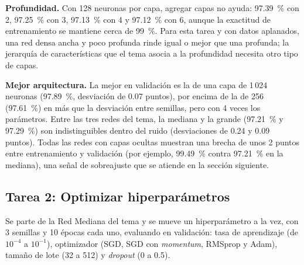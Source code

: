 \documentclass[11pt,letterpaper]{article}
\begin{document}
\textbf{Profundidad.} Con 128 neuronas por capa, agregar capas no ayuda: 97.39~\% con 2, 97.25~\% con 3, 97.13~\% con 4 y 97.12~\% con 6, aunque la exactitud de entrenamiento se mantiene cerca de 99~\%. Para esta tarea y con datos aplanados, una red densa ancha y poco profunda rinde igual o mejor que una profunda; la jerarquía de características que el tema asocia a la profundidad \parencite{iae_u4_t44} necesita otro tipo de capas.

\textbf{Mejor arquitectura.} La mejor en validación es la de una capa de 1\,024 neuronas (97.89~\%, desviación de 0.07 puntos), por encima de la de 256 (97.61~\%) en más que la desviación entre semillas, pero con 4 veces los parámetros. Entre las tres redes del tema, la mediana y la grande (97.21~\% y 97.29~\%) son indistinguibles dentro del ruido (desviaciones de 0.24 y 0.09 puntos). Todas las redes con capas ocultas muestran una brecha de unos 2 puntos entre entrenamiento y validación (por ejemplo, 99.49~\% contra 97.21~\% en la mediana), una señal de sobreajuste que se atiende en la sección siguiente.

\subsection{Tarea 2: Optimizar hiperparámetros}

Se parte de la Red Mediana del tema y se mueve un hiperparámetro a la vez, con 3 semillas y 10 épocas cada uno, evaluando en validación: tasa de aprendizaje (de $10^{-4}$ a $10^{-1}$), optimizador (SGD, SGD con \textit{momentum}, RMSprop y Adam), tamaño de lote (32 a 512) y \textit{dropout} (0 a 0.5).
\end{document}
